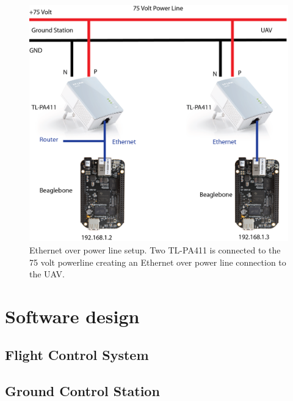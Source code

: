 \begin{figure}[hbtp]
\centering
\includegraphics[scale=0.75]{graphics/EthernetLink.png}
\caption{Ethernet over power line setup. Two TL-PA411 is connected to the 75 volt powerline creating an Ethernet over power line connection to the UAV.}
\label{fig:Networking}
\end{figure}



\section{Software design}


\subsection{Flight Control System}


\subsection{Ground Control Station}
